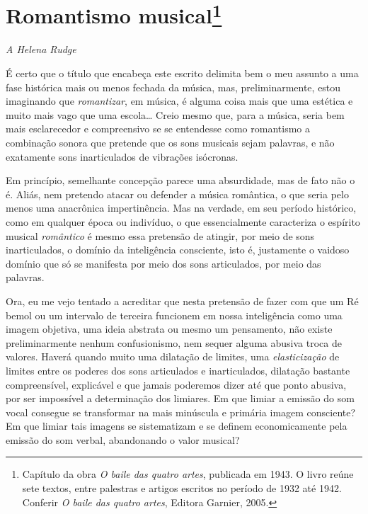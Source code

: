 \chapter{Romantismo musical\footnote{Capítulo da obra \textit{O baile das quatro artes}, publicada em 1943. O livro reúne sete textos, entre palestras e artigos escritos no período de 1932 até 1942. Conferir \textit{O baile das quatro artes}, Editora Garnier, 2005.}}


\begin{flushright}
\textit{A Helena Rudge}
\end{flushright}

\noindent{}É certo que o título que encabeça este escrito delimita bem o meu
assunto a uma fase histórica mais ou menos fechada da música, mas,
preliminarmente, estou imaginando que \textit{romantizar}, em música, é
alguma coisa mais que uma estética e muito mais vago que uma escola\ldots{}
Creio mesmo que, para a música, seria bem mais esclarecedor e
compreensivo se se entendesse como romantismo a combinação sonora que
pretende que os sons musicais sejam palavras, e não exatamente sons
inarticulados de vibrações isócronas.

Em princípio, semelhante concepção parece uma absurdidade, mas de fato
não o é. Aliás, nem pretendo atacar ou defender a música romântica, o
que seria pelo menos uma anacrônica impertinência. Mas na verdade, em
seu período histórico, como em qualquer época ou indivíduo, o que
essencialmente caracteriza o espírito musical \textit{romântico} é mesmo essa
pretensão de atingir, por meio de sons inarticulados, o domínio da
inteligência consciente, isto é, justamente o vaidoso domínio que só se
manifesta por meio dos sons articulados, por meio das palavras.

Ora, eu me vejo tentado a acreditar que nesta pretensão de fazer com que
um Ré bemol ou um intervalo de terceira funcionem em nossa inteligência
como uma imagem objetiva, uma ideia abstrata ou mesmo um pensamento, não
existe preliminarmente nenhum confusionismo, nem sequer alguma abusiva
troca de valores. Haverá quando muito uma dilatação de limites, uma
\textit{elasticização} de limites entre os poderes dos sons articulados e
inarticulados, dilatação bastante compreensível, explicável e que jamais
poderemos dizer até que ponto abusiva, por ser impossível a determinação
dos limiares. Em que limiar a emissão do som vocal consegue se
transformar na mais minúscula e primária imagem consciente? Em que
limiar tais imagens se sistematizam e se definem economicamente pela
emissão do som verbal, abandonando o valor musical?


